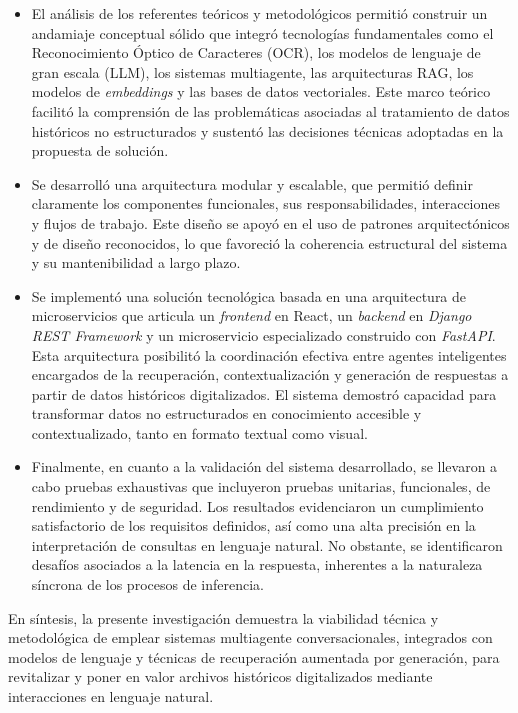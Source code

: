 \begin{itemize}
	\item El análisis de los referentes teóricos y metodológicos permitió construir un andamiaje conceptual sólido que integró tecnologías fundamentales como el Reconocimiento Óptico de Caracteres (OCR), los modelos de lenguaje de gran escala (LLM), los sistemas multiagente, las arquitecturas RAG, los modelos de \textit{embeddings} y las bases de datos vectoriales. Este marco teórico facilitó la comprensión de las problemáticas asociadas al tratamiento de datos históricos no estructurados y sustentó las decisiones técnicas adoptadas en la propuesta de solución.
	
	\item Se desarrolló una arquitectura modular y escalable, que permitió definir claramente los componentes funcionales, sus responsabilidades, interacciones y flujos de trabajo. Este diseño se apoyó en el uso de patrones arquitectónicos y de diseño reconocidos, lo que favoreció la coherencia estructural del sistema y su mantenibilidad a largo plazo.
	
	\item Se implementó una solución tecnológica basada en una arquitectura de microservicios que articula un \textit{frontend} en React, un \textit{backend} en \textit{Django REST Framework} y un microservicio especializado construido con \textit{FastAPI}. Esta arquitectura posibilitó la coordinación efectiva entre agentes inteligentes encargados de la recuperación, contextualización y generación de respuestas a partir de datos históricos digitalizados. El sistema demostró capacidad para transformar datos no estructurados en conocimiento accesible y contextualizado, tanto en formato textual como visual.
	
	\item Finalmente, en cuanto a la validación del sistema desarrollado, se llevaron a cabo pruebas exhaustivas que incluyeron pruebas unitarias, funcionales, de rendimiento y de seguridad. Los resultados evidenciaron un cumplimiento satisfactorio de los requisitos definidos, así como una alta precisión en la interpretación de consultas en lenguaje natural. No obstante, se identificaron desafíos asociados a la latencia en la respuesta, inherentes a la naturaleza síncrona de los procesos de inferencia.
\end{itemize}

En síntesis, la presente investigación demuestra la viabilidad técnica y metodológica de emplear sistemas multiagente conversacionales, integrados con modelos de lenguaje y técnicas de recuperación aumentada por generación, para revitalizar y poner en valor archivos históricos digitalizados mediante interacciones en lenguaje natural.
